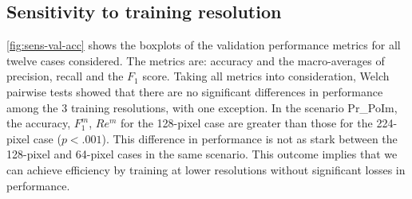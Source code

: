 \documentclass[Journal,letterpaper, SingleSpace, InsideFigs]{ascelike-new}
\begin{document}
\subsection{Sensitivity to training resolution}
\autoref{fig:sens-val-acc} shows the boxplots of the validation performance metrics for all twelve cases considered.
The metrics are: accuracy and the macro-averages of precision, recall and the $F_{1}$ score.
Taking all metrics into consideration, Welch pairwise tests showed that there are no significant differences in performance among the 3 training resolutions, with one exception.
In the scenario Pr\_PoIm, the accuracy, $F_{1}^{m}$, $Re^{m}$ for the 128-pixel case are greater than those for the 224-pixel case ($p<.001$).
This difference in performance is not as stark between the 128-pixel and 64-pixel cases in the same scenario.
This outcome implies that we can achieve efficiency by  training at lower resolutions without significant losses in performance.

\end{document}
